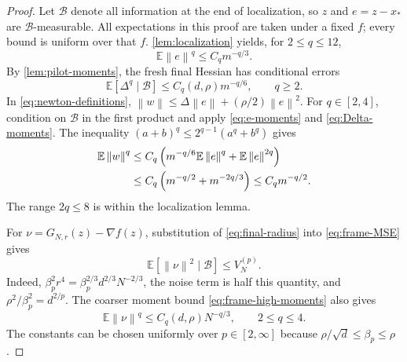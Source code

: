 \documentclass[11pt,a4paper]{article}
\newcommand{\E}{\mathbb E}
\newcommand{\norm}[1]{\left\lVert#1\right\rVert}
\theoremstyle{definition}
\theoremstyle{remark}
\begin{document}
\begin{proof}
Let $\mathcal B$ denote all information at the end of localization, so $z$ and $e=z-x_*$ are $\mathcal B$-measurable. All expectations in this proof are taken under a fixed $f$; every bound is uniform over that $f$.
\cref{lem:localization} yields, for $2\le q\le12$,
\begin{equation}\label{eq:e-moments}
 \E\norm e^q\le C_qm^{-q/3}.
\end{equation}
By \cref{lem:pilot-moments}, the fresh final Hessian has conditional errors
\begin{equation}\label{eq:Delta-moments}
 \E[\Delta^q\mid\mathcal B]\le C_q(d,\rho)m^{-q/6},\qquad q\ge2.
\end{equation}
In \eqref{eq:newton-definitions}, $\norm w\le\Delta\norm e+(\rho/2)\norm e^2$. For $q\in[2,4]$, condition on $\mathcal B$ in the first product and apply \eqref{eq:e-moments} and \eqref{eq:Delta-moments}. The inequality $(a+b)^q\le2^{q-1}(a^q+b^q)$ gives
\begin{align}
 \E\norm w^q
 &\le C_q\left(m^{-q/6}\E\norm e^q+\E\norm e^{2q}\right)\notag\\
 &\le C_q\left(m^{-q/2}+m^{-2q/3}\right)
 \le C_qm^{-q/2}.
 \label{eq:w-moments}
\end{align}
The range $2q\le8$ is within the localization lemma.

For $\nu=G_{N,r}(z)-\nabla f(z)$, substitution of \eqref{eq:final-radius} into \eqref{eq:frame-MSE} gives
\begin{equation}\label{eq:nu-MSE}
 \E[\norm\nu^2\mid\mathcal B]\le V_N^{(p)}.
\end{equation}
Indeed, $\beta_p^2r^4=\beta_p^{2/3}d^{2/3}N^{-2/3}$, the noise term is half this quantity, and $\rho^2/\beta_p^2=d^{2/p}$.
The coarser moment bound \eqref{eq:frame-high-moments} also gives
\begin{equation}\label{eq:nu-high}
 \E\norm\nu^q\le C_q(d,\rho)N^{-q/3},\qquad 2\le q\le4.
\end{equation}
The constants can be chosen uniformly over $p\in[2,\infty]$ because $\rho/\sqrt d\le\beta_p\le\rho$.


\end{proof}
\end{document}
